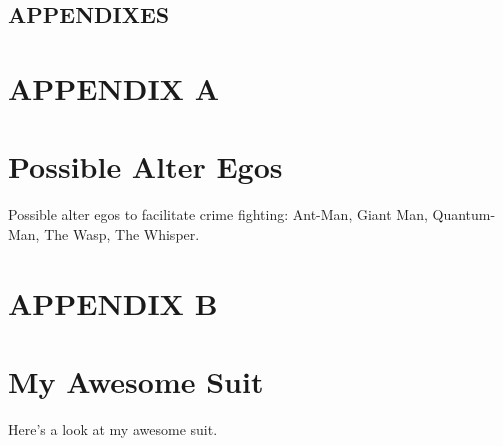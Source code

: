 \documentclass[letterpaper]{article}
\begin{document}
\begin{flushleft}
{%
\newpage
\appendix
{}
\renewcommand\thesubsection{\Alph{subsection}}
\newpage

\begin{center}
\vspace*{\fill}
\section*{\normalfont APPENDIXES}
\vspace*{\fill}
\end{center}

\newpage
\section*{\normalfont APPENDIX A} \label{App:A}
\section*{Possible Alter Egos} 
Possible alter egos to facilitate crime fighting: Ant-Man, Giant Man, Quantum-Man, The Wasp, The Whisper. 

\newpage
\section*{\normalfont APPENDIX B} \label{App:B}
\section*{My Awesome Suit} 

Here's a look at my awesome suit. 

}

\end{flushleft}
\end{document}
